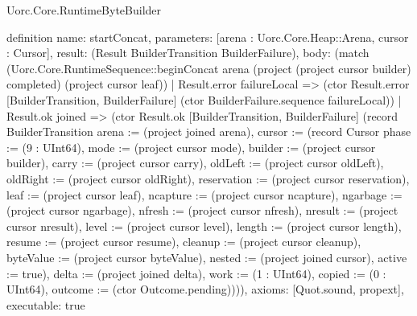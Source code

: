 \begin{lexlean}{Uorc.Core.RuntimeByteBuilder}
\begin{semanticmodule}
definition{
  name: startConcat,
  parameters: [arena : Uorc.Core.Heap::Arena, cursor : Cursor],
  result: (Result BuilderTransition BuilderFailure),
  body: (match (Uorc.Core.RuntimeSequence::beginConcat arena (project (project cursor builder) completed) (project cursor leaf))
    | Result.error failureLocal => (ctor Result.error [BuilderTransition, BuilderFailure] (ctor BuilderFailure.sequence failureLocal))
    | Result.ok joined => (ctor Result.ok [BuilderTransition, BuilderFailure] (record BuilderTransition {arena := (project joined arena), cursor := (record Cursor {phase := (9 : UInt64), mode := (project cursor mode), builder := (project cursor builder), carry := (project cursor carry), oldLeft := (project cursor oldLeft), oldRight := (project cursor oldRight), reservation := (project cursor reservation), leaf := (project cursor leaf), ncapture := (project cursor ncapture), ngarbage := (project cursor ngarbage), nfresh := (project cursor nfresh), nresult := (project cursor nresult), level := (project cursor level), length := (project cursor length), resume := (project cursor resume), cleanup := (project cursor cleanup), byteValue := (project cursor byteValue), nested := (project joined cursor), active := true}), delta := (project joined delta), work := (1 : UInt64), copied := (0 : UInt64), outcome := (ctor Outcome.pending)}))),
  axioms: [Quot.sound, propext],
  executable: true
}


\end{semanticmodule}
\end{lexlean}
